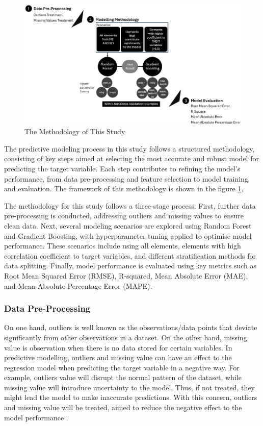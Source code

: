 \documentclass[11pt,a4paper,]{article}
\begin{document}
\begin{figure}

{\centering \includegraphics[width=0.95\linewidth]{Final_report_files/figure-latex/Methodologyv2} 

}

\caption{The Methodology of This Study}\label{fig:modelbuilding}
\end{figure}

The predictive modeling process in this study follows a structured methodology, consisting of key steps aimed at selecting the most accurate and robust model for predicting the target variable. Each step contributes to refining the model's performance, from data pre-processing and feature selection to model training and evaluation. The framework of this methodology is shown in the figure \ref{fig:modelbuilding}.

The methodology for this study follows a three-stage process. First, further data pre-processing is conducted, addressing outliers and missing values to ensure clean data. Next, several modeling scenarios are explored using Random Forest and Gradient Boosting, with hyperparameter tuning applied to optimise model performance. These scenarios include using all elements, elements with high correlation coefficient to target variables, and different stratification methods for data splitting. Finally, model performance is evaluated using key metrics such as Root Mean Squared Error (RMSE), R-squared, Mean Absolute Error (MAE), and Mean Absolute Percentage Error (MAPE).

\subsubsection{Data Pre-Processing}\label{data-pre-processing}

On one hand, outliers is well known as the observations/data points that deviate significantly from other observations in a dataset. On the other hand, missing value is observation when there is no data stored for certain variables. In predictive modelling, outliers and missing value can have an effect to the regression model when predicting the target variable in a negative way. For example, outliers value will disrupt the normal pattern of the dataset, while missing value will introduce uncertainty to the model. Thus, if not treated, they might lead the model to make inaccurate predictions. With this concern, outliers and missing value will be treated, aimed to reduce the negative effect to the model performance \autocite{Hastie09}.
\end{document}
